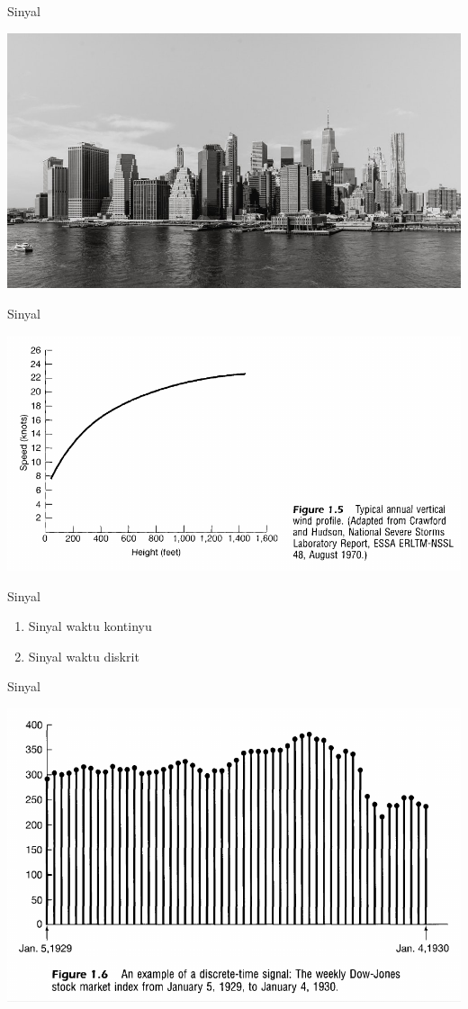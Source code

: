 \documentclass[pdflatex,compress,mathserif]{beamer}
\begin{document}
\begin{frame}{Sinyal}
	\begin{center}
		\includegraphics[width=0.7\linewidth]{img/img04}
	\end{center}
\end{frame}

\begin{frame}{Sinyal}
	\begin{center}
		\includegraphics[width=0.7\linewidth]{img/img05}
	\end{center}
\end{frame}

\begin{frame}{Sinyal}
	\begin{enumerate}
		\item Sinyal waktu kontinyu
		\item Sinyal waktu diskrit
	\end{enumerate}
\end{frame}

\begin{frame}{Sinyal}
	\begin{center}
		\includegraphics[width=0.7\linewidth]{img/img06}
	\end{center}
\end{frame}
\end{document}
